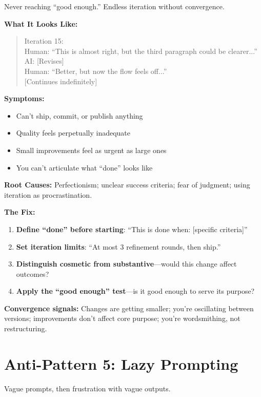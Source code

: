 Never reaching ``good enough.'' Endless iteration without convergence.

\textbf{What It Looks Like:}

\begin{quote}
Iteration 15:\\
Human: ``This is almost right, but the third paragraph could be clearer...''\\
AI: [Revises]\\
Human: ``Better, but now the flow feels off...''\\
{[Continues indefinitely]}
\end{quote}

\textbf{Symptoms:}
\begin{itemize}
    \item Can't ship, commit, or publish anything
    \item Quality feels perpetually inadequate
    \item Small improvements feel as urgent as large ones
    \item You can't articulate what ``done'' looks like
\end{itemize}

\textbf{Root Causes:} Perfectionism; unclear success criteria; fear of judgment; using iteration as procrastination.

\textbf{The Fix:}
\begin{enumerate}
    \item \textbf{Define ``done'' before starting}: ``This is done when: [specific criteria]''
    \item \textbf{Set iteration limits}: ``At most 3 refinement rounds, then ship.''
    \item \textbf{Distinguish cosmetic from substantive}---would this change affect outcomes?
    \item \textbf{Apply the ``good enough'' test}---is it good enough to serve its purpose?
\end{enumerate}

\textbf{Convergence signals:} Changes are getting smaller; you're oscillating between versions; improvements don't affect core purpose; you're wordsmithing, not restructuring.

\section{Anti-Pattern 5: Lazy Prompting}

Vague prompts, then frustration with vague outputs.


